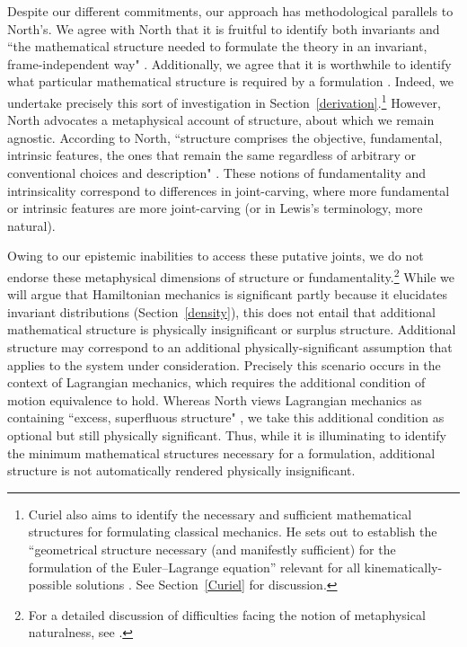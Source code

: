 \documentclass[letterpaper]{article}
\begin{document}
Despite our different commitments, our approach has methodological parallels to North's. We agree with North that it is fruitful to identify both invariants and ``the mathematical structure needed to formulate the theory in an invariant, frame-independent way" \parencites*[65]{North}. Additionally, we agree that it is worthwhile to identify what particular mathematical structure is required by a formulation \parencites[78]{North}. Indeed, we undertake precisely this sort of investigation in Section~\ref{derivation}.\footnote{Curiel also aims to identify the necessary and sufficient mathematical structures for formulating classical mechanics. He sets out to establish the ``geometrical structure necessary (and manifestly sufficient) for the formulation of the Euler--Lagrange equation'' relevant for all kinematically-possible solutions \parencites*[292]{Curiel}. See Section~\ref{Curiel} for discussion.} However, North advocates a metaphysical account of structure, about which we remain agnostic. According to North, ``structure comprises the objective, fundamental, intrinsic features, the ones that remain the same regardless of arbitrary or conventional choices and description" \parencites*[66]{North}. These notions of fundamentality and intrinsicality correspond to differences in joint-carving, where more fundamental or intrinsic features are more joint-carving (or in Lewis's \parencites*[]{Lewis1983} terminology, more natural). 

Owing to our epistemic inabilities to access these putative joints, we do not endorse these metaphysical dimensions of structure or fundamentality.\footnote{For a detailed discussion of difficulties facing the notion of metaphysical naturalness, see \textcites[]{Dorr_Hawthorne}.} While we will argue that Hamiltonian mechanics is significant partly because it elucidates invariant distributions (Section~\ref{density}), this does not entail that additional mathematical structure is physically insignificant or surplus structure. Additional structure may correspond to an additional physically-significant assumption that applies to the system under consideration. Precisely this scenario occurs in the context of Lagrangian mechanics, which requires the additional condition of motion equivalence to hold. Whereas North views Lagrangian mechanics as containing ``excess, superfluous structure" \parencites*[75]{North}, we take this additional condition as optional but still physically significant. Thus, while it is illuminating to identify the minimum mathematical structures necessary for a formulation, additional structure is not automatically rendered physically insignificant. %
\end{document}
